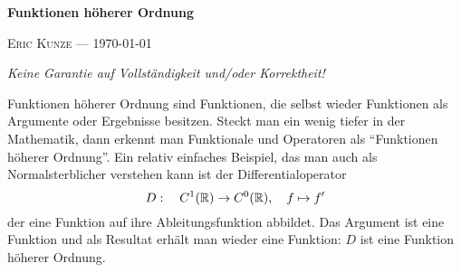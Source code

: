 \documentclass[ngerman, a4paper, 11pt]{article}
\theoremstyle{nonumberplain}
\newcommand*\ruleline[1]{\par\noindent\raisebox{.8ex}{\makebox[\linewidth]{\hrulefill\hspace{1ex}\raisebox{-.8ex}{#1}\hspace{1ex}\hrulefill}}}
\begin{document}
	\begin{center}
		{\bfseries \sffamily \huge Funktionen höherer Ordnung} 
		
		\ruleline{\sffamily \Large Übungsblatt 3}
		
		{\scshape Eric Kunze --- \today}
	\end{center}
	\medskip
	
	{ \footnotesize \doclicenseThis }
	
	\begin{center}
		\small \slshape Keine Garantie auf Vollständigkeit und/oder Korrektheit!
	\end{center}
	
Funktionen höherer Ordnung sind Funktionen, die selbst wieder Funktionen als Argumente oder Ergebnisse besitzen.
Steckt man ein wenig tiefer in der Mathematik, dann erkennt man Funktionale und Operatoren als \enquote{Funktionen höherer Ordnung}. Ein relativ einfaches Beispiel, das man auch als Normalsterblicher verstehen kann ist der Differentialoperator
\begin{equation*}
	D: \quad C^1(\mathbb{R}) \to C^0(\mathbb{R}), \quad f \mapsto f'
\end{equation*}
der eine Funktion auf ihre Ableitungsfunktion abbildet. Das Argument ist eine Funktion und als Resultat erhält man wieder eine Funktion: $D$ ist eine Funktion höherer Ordnung. 
\end{document}
